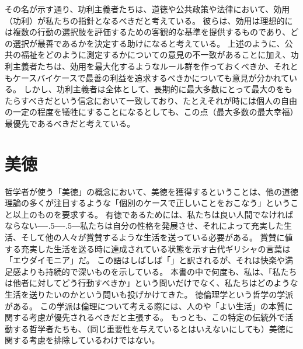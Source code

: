\documentclass[paper=a4,book,openany]{jlreq}
\def\DDASH{―\kern-.5\zw―\kern-.5\zw―} %
\begin{document}
その名が示す通り、功利主義者たちは、道徳や公共政策や法律において、効用（功利）が私たちの指針となるべきだと考えている。
彼らは、効用は理想的には複数の行動の選択肢を評価するための客観的な基準を提供するものであり、どの選択が最善であるかを決定する助けになると考えている。
上述のように、公共の福祉をどのように測定するかについての意見の不一致があることに加え、功利主義者たちは、効用を最大化するようなルール群を作っておくべきか、それともケースバイケースで最善の利益を追求するべきかについても意見が分かれている。
しかし、功利主義者は全体として、長期的に最大多数にとって最大のをもたらすべきだという信念において一致しており、たとえそれが時には個人の自由の一定の程度を犠牲にすることになるとしても、この点（最大多数の最大幸福）最優先であるべきだと考えている。

\section{美徳}

哲学者が使う「美徳」の概念において、美徳を獲得するということは、他の道徳理論の多くが注目するような「個別のケースで正しいことをおこなう」ということ以上のものを要求する。
有徳であるためには、私たちは良い人間でなければならない{\DDASH}私たちは自分の性格を発展させ、それによって充実した生活、そして他の人々が賞賛するような生活を送っている必要がある。
賞賛に値する充実した生活を送る時に達成されている状態を示す古代ギリシャの言葉は「エウダイモニア」だ。
この語はしばしば「」と訳されるが、それは快楽や満足感よりも持続的で深いものを示している。
本書の中で何度も、私は、「私たちは他者に対してどう行動すべきか」という問いだけでなく、私たちはどのような生活を送りたいのかという問いも投げかけてきた。
徳倫理学という哲学の学派がある。
この学派は倫理について考える際には、人のや「よい生活」の本質に関する考慮が優先されるべきだと主張する。
もっとも、この特定の伝統外で活動する哲学者たちも、（同じ重要性を与えているとはいえないにしても）美徳に関する考慮を排除しているわけではない。
\end{document}
